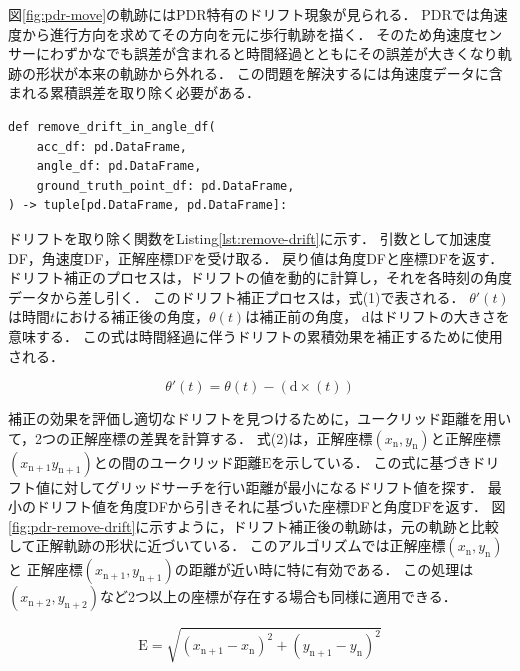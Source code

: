


図\ref{fig:pdr-move}の軌跡にはPDR特有のドリフト現象が見られる．
PDRでは角速度から進行方向を求めてその方向を元に歩行軌跡を描く．
そのため角速度センサーにわずかなでも誤差が含まれると時間経過とともにその誤差が大きくなり軌跡の形状が本来の軌跡から外れる．
この問題を解決するには角速度データに含まれる累積誤差を取り除く必要がある．


\begin{lstlisting}[caption={ドリフト除去}, label=lst:remove-drift]
def remove_drift_in_angle_df(
    acc_df: pd.DataFrame,
    angle_df: pd.DataFrame,
    ground_truth_point_df: pd.DataFrame,
) -> tuple[pd.DataFrame, pd.DataFrame]:
\end{lstlisting}

ドリフトを取り除く関数をListing\ref{lst:remove-drift}に示す．
引数として加速度DF，角速度DF，正解座標DFを受け取る．
戻り値は角度DFと座標DFを返す．
ドリフト補正のプロセスは，ドリフトの値を動的に計算し，それを各時刻の角度データから差し引く．
このドリフト補正プロセスは，式(1)で表される．
$\theta'(t)$は時間$t$における補正後の角度，$\theta(t)$は補正前の角度，
$\mathrm{d}$はドリフトの大きさを意味する．
この式は時間経過に伴うドリフトの累積効果を補正するために使用される．


\vspace{5mm} %
\begin{equation}
	\theta'(t) = \theta(t) - (\mathrm{d} \times (t))
\end{equation}

\vspace{5mm} %

補正の効果を評価し適切なドリフトを見つけるために，ユークリッド距離を用いて，2つの正解座標の差異を計算する．
式(2)は，正解座標$(x_{\mathrm{n}}, y_{\mathrm{n}})$と正解座標$(x_{\mathrm{n+1}}
	y_{\mathrm{n+1}})$との間のユークリッド距離$\mathrm{E}$を示している．
この式に基づきドリフト値に対してグリッドサーチを行い距離が最小になるドリフト値を探す．
最小のドリフト値を角度DFから引きそれに基づいた座標DFと角度DFを返す．
図\ref{fig:pdr-remove-drift}に示すように，ドリフト補正後の軌跡は，元の軌跡と比較して正解軌跡の形状に近づいている．
このアルゴリズムでは正解座標$(x_{\mathrm{n}}, y_{\mathrm{n}})$と
正解座標$(x_{\mathrm{n+1}}, y_{\mathrm{n+1}})$の距離が近い時に特に有効である．
この処理は$(x_{\mathrm{n+2}}, y_{\mathrm{n+2}})$など2つ以上の座標が存在する場合も同様に適用できる．

\vspace{5mm} %
\begin{equation}
	\mathrm{E} = \sqrt{(x_{\mathrm{n+1}} - x_{\mathrm{n}})^2 + (y_{\mathrm{n+1}} - y_{\mathrm{n}})^2}
\end{equation}
\vspace{5mm} %


